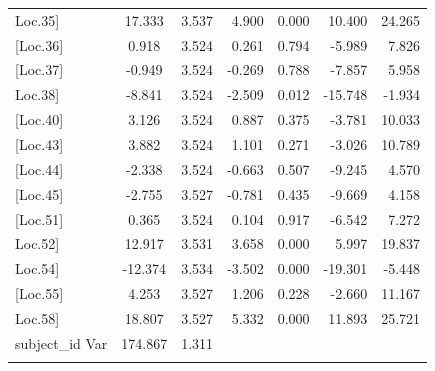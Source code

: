 \begin{longtable}{@{\extracolsep{\fill}}p{2.8cm}clrrrr@{}}
	 \setrow{\bfseries}{[}Loc.35{]} & \setrow{\bfseries} 17.333  & \setrow{\bfseries} 3.537 & \setrow{\bfseries} 4.900  & \setrow{\bfseries} 0.000 & \setrow{\bfseries} 10.400  & \setrow{\bfseries} 24.265  \\
	{[}Loc.36{]} & 0.918   & 3.524 & 0.261  & 0.794 & -5.989  & 7.826   \\
	{[}Loc.37{]} & -0.949  & 3.524 & -0.269 & 0.788 & -7.857  & 5.958   \\
	 \setrow{\bfseries}{[}Loc.38{]} & \setrow{\bfseries} -8.841  & \setrow{\bfseries} 3.524 & \setrow{\bfseries} -2.509 & \setrow{\bfseries} 0.012 & \setrow{\bfseries} -15.748 & \setrow{\bfseries} -1.934  \\
	{[}Loc.40{]} & 3.126   & 3.524 & 0.887  & 0.375 & -3.781  & 10.033  \\
	{[}Loc.43{]} & 3.882   & 3.524 & 1.101  & 0.271 & -3.026  & 10.789  \\
	{[}Loc.44{]} & -2.338  & 3.524 & -0.663 & 0.507 & -9.245  & 4.570   \\
	{[}Loc.45{]} & -2.755  & 3.527 & -0.781 & 0.435 & -9.669  & 4.158   \\
	{[}Loc.51{]} & 0.365   & 3.524 & 0.104  & 0.917 & -6.542  & 7.272   \\
	 \setrow{\bfseries}{[}Loc.52{]} & \setrow{\bfseries} 12.917  & \setrow{\bfseries} 3.531 & \setrow{\bfseries} 3.658  & \setrow{\bfseries} 0.000 & \setrow{\bfseries} 5.997   & \setrow{\bfseries} 19.837  \\
	 \setrow{\bfseries}{[}Loc.54{]} & \setrow{\bfseries} -12.374 & \setrow{\bfseries} 3.534 & \setrow{\bfseries} -3.502 & \setrow{\bfseries} 0.000 & \setrow{\bfseries} -19.301 & \setrow{\bfseries} -5.448  \\
	{[}Loc.55{]} & 4.253   & 3.527 & 1.206  & 0.228 & -2.660  & 11.167  \\
	 \setrow{\bfseries}{[}Loc.58{]} & \setrow{\bfseries} 18.807  & \setrow{\bfseries} 3.527 & \setrow{\bfseries} 5.332  & \setrow{\bfseries} 0.000 & \setrow{\bfseries} 11.893  & \setrow{\bfseries} 25.721  \\
	 subject\_id Var & 174.867 & 1.311 & {} & {} & {} & {} \\
	\hline
	
	\label{tab:angle_loc}
\end{longtable}
\endgroup

